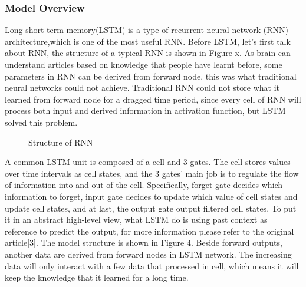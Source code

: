 \documentclass{article}
\begin{document}
\subsubsection{Model Overview}
Long short-term memory(LSTM) is a type of recurrent neural network (RNN) architecture,which is one of the most useful RNN.  Before LSTM, let's first talk about RNN, the structure of a typical RNN is shown in Figure x. As brain can understand articles based on knowledge that people have learnt before, some parameters in RNN can be derived from forward node, this was what traditional neural networks could not achieve. Traditional RNN could not store what it learned from forward node for a dragged time period, since every cell of RNN will process both input and derived information in activation function, but LSTM solved this problem.
\begin{figure}[H]
  \centering
  \caption{Structure of RNN}
\end{figure}

A common LSTM unit is composed of a cell and 3 gates. The cell stores values over time intervals as cell states, and the 3 gates’ main job is to regulate the flow of information into and out of the cell. Specifically, forget gate decides which information to forget, input gate decides to update which value of cell states and update cell states, and at last, the output gate output filtered cell states. To put it in an abstract high-level view, what LSTM do is using past context as reference to predict the output, for more information please refer to the original article[3]. The model structure is shown in Figure 4.
Beside forward outputs, another data are derived from forward nodes in LSTM network. The increasing data will only interact with a few data that processed in cell, which means it will keep the knowledge that it learned for a long time.
\end{document}
